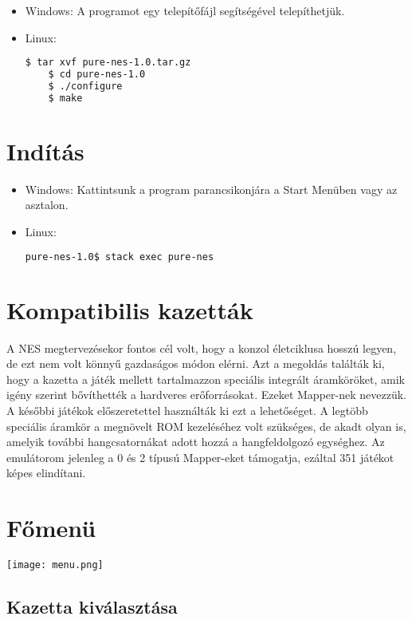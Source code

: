 \begin{itemize}
	\item Windows: A programot egy telepítőfájl segítségével telepíthetjük.
	\item Linux:
	\begin{lstlisting}[language=bash]
	$ tar xvf pure-nes-1.0.tar.gz
	$ cd pure-nes-1.0
	$ ./configure
	$ make
	\end{lstlisting}
\end{itemize}

\section{Indítás}
\begin{itemize}
	\item Windows: Kattintsunk a program parancsikonjára a Start Menüben vagy az asztalon.
	\item Linux:
	\begin{lstlisting}[language=bash]
	pure-nes-1.0$ stack exec pure-nes
	\end{lstlisting}
\end{itemize}


\section{Kompatibilis kazetták}

A NES megtervezésekor fontos cél volt, hogy a konzol életciklusa hosszú legyen, de ezt nem volt könnyű gazdaságos módon elérni. Azt a megoldás találták ki, hogy a kazetta a játék mellett tartalmazzon speciális integrált áramköröket, amik igény szerint bővíthették a hardveres erőforrásokat. Ezeket Mapper-nek nevezzük. A későbbi játékok előszeretettel használták ki ezt a lehetőséget. A legtöbb speciális áramkör a megnövelt ROM kezeléséhez volt szükséges, de akadt olyan is, amelyik további hangcsatornákat adott hozzá a hangfeldolgozó egységhez. Az emulátorom jelenleg a 0 és 2 típusú Mapper-eket támogatja, ezáltal 351 játékot képes elindítani.      

\section{Főmenü}

\begin{center}
	\texttt{[image: menu.png]}
\end{center}

\subsection{Kazetta kiválasztása}

